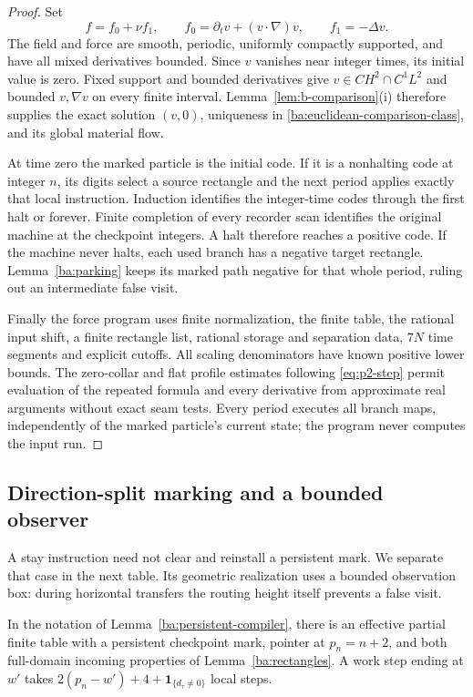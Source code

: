 \begin{proof}
Set
\[
 f=f_0+\nu f_1,\qquad
 f_0=\partial_tv+(v\cdot\nabla)v,\qquad f_1=-\Delta v.
\]
The field and force are smooth, periodic, uniformly compactly supported,
and have all mixed derivatives bounded.  Since $v$ vanishes near integer
times, its initial value is zero.  Fixed support and bounded derivatives
give $v\in CH^2\cap C^1L^2$ and bounded $v,\nabla v$ on every finite
interval.  Lemma~\ref{lem:b-comparison}(i) therefore supplies the exact
solution $(v,0)$, uniqueness in
\eqref{ba:euclidean-comparison-class}, and its global material flow.

At time zero the marked particle is the initial code.  If it is a
nonhalting code at integer $n$, its digits select a source rectangle and
the next period applies exactly that local instruction.  Induction
identifies the integer-time codes through the first halt or forever.
Finite completion of every recorder scan identifies the original
machine at the checkpoint integers.  A halt therefore reaches a positive
code.  If the machine never halts, each used branch has a negative target
rectangle.  Lemma~\ref{ba:parking} keeps its marked path negative for
that whole period, ruling out an intermediate false visit.

Finally the force program uses finite normalization, the finite table,
the rational input shift, a finite rectangle list, rational storage and
separation data, $7N$ time segments and explicit cutoffs.  All scaling
denominators have known positive lower bounds.  The zero-collar and flat
profile estimates following \eqref{eq:p2-step} permit evaluation of the
repeated formula and every derivative from approximate real arguments
without exact seam tests.
Every period executes all branch maps, independently of the marked
particle's current state; the program never computes the input run.
\end{proof}

\subsection{Direction-split marking and a bounded observer}
\label{ba:bounded-box-native}

A stay instruction need not clear and reinstall a persistent mark.
We separate that case in the next table.  Its geometric realization
uses a bounded observation box: during horizontal transfers the routing
height itself prevents a false visit.

\begin{lemma}
\label{ba:split-mark-compiler}
In the notation of Lemma~\ref{ba:persistent-compiler}, there is an
effective partial finite table with a persistent checkpoint mark,
pointer at $p_n=n+2$, and both full-domain incoming properties of
Lemma~\ref{ba:rectangles}.  A work step ending at $w'$ takes
$2(p_n-w')+4+\mathbf1_{\{d_\tau\ne0\}}$ local steps.
\end{lemma}

